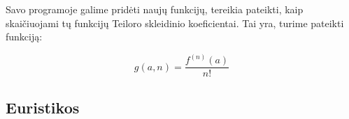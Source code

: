 	Savo programoje galime pridėti naujų funkcijų, tereikia pateikti, kaip skaičiuojami tų funkcijų Teiloro skleidinio koeficientai. 
	Tai yra, turime pateikti funkciją: 
	
	\[ g(a,n) = \frac{f^{(n)}(a)}{n!}\]
	
	
\subsection{Euristikos}
	
	
	